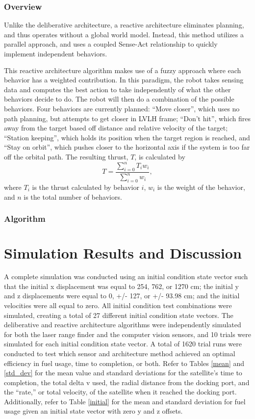 \documentclass[journal, 10pt]{IEEEtran}
\begin{document}
\subsubsection{Overview}
Unlike the deliberative architecture, a reactive architecture eliminates planning, and thus operates without a global world model. Instead, this method utilizes a parallel approach, and uses a coupled Sense-Act relationship to quickly implement independent behaviors\cite{joshi}. 

This reactive architecture algorithm makes use of a fuzzy approach where each behavior has a weighted contribution. In this paradigm, the robot takes sensing data and computes the best action to take independently of what the other behaviors decide to do. The robot will then do a combination of the possible behaviors. Four behaviors are currently planned: ``Move closer'', which uses no path planning, but attempts to get closer in LVLH frame; ``Don't hit'', which fires away from the target based off distance and relative velocity of the target; ``Station keeping'', which holds its position when the target region is reached, and ``Stay on orbit'', which pushes closer to the horizontal axis if the system is too far off the orbital path. The resulting thrust, $T$, is calculated by
\begin{equation}
T = \frac{ \sum^{n}_{i=0} T_i w_i} { \sum^{n}_{i=0} w_i },
\end{equation}
where $T_i$ is the thrust calculated by behavior $i$, $w_i$ is the weight of the behavior, and $n$ is the total number of behaviors.

\subsubsection{Algorithm}


\section{Simulation Results and Discussion} \label{discuss}
A complete simulation was conducted using an initial condition state vector such that the initial x displacement was equal to 254, 762, or 1270 cm; the initial y and z displacements were equal to 0, +/- 127, or +/- 93.98 cm; and the initial velocities were all equal to zero. All initial condition test combinations were simulated, creating a total of 27 different initial condition state vectors. The deliberative and reactive architecture algorithms were independently simulated for both the laser range finder and the computer vision sensors, and 10 trials were simulated for each initial condition state vector. A total of 1620 trial runs were conducted to test which sensor and architecture method achieved an optimal efficiency in fuel usage, time to completion, or both. Refer to Tables \ref{mean} and \ref{std_dev} for the mean value and standard deviations for the satellite's time to completion, the total delta v used, the radial distance from the docking port, and the ``rate,'' or total velocity, of the satellite when it reached the docking port. Additionally, refer to Table \ref{initial} for the mean and standard deviation for fuel usage given an initial state vector with zero y and z offsets. 
\end{document}
